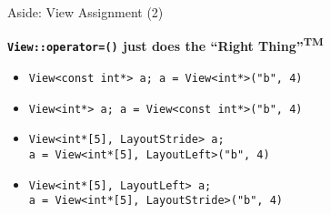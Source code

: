 \begin{frame}[fragile]{Aside: View Assignment (2)}

  \textbf{\texttt{View::operator=()} just does the ``Right Thing''\textsuperscript{TM}}

  \vspace{5pt}

  \begin{itemize}
    \item{\texttt{View<const int*> a; a = View<int*>("b", 4)}}\\
    \pause
    {\color{darkgreen}{$=>$ Okay}}
    \pause
    \item{\texttt{View<int*> a; a = View<const int*>("b", 4)}}\\
    \pause
    {\color{darkred}{$=>$ Compilation error}}
    \pause
    \item{\texttt{View<int*[5], LayoutStride> a;}\\ \texttt{a = View<int*[5], LayoutLeft>("b", 4)}}
    \pause
    {\color{darkgreen}{$=>$ Okay, converting compile-time strides into runtime strides}}
    \pause
    \item{\texttt{View<int*[5], LayoutLeft> a;}\\ \texttt{a = View<int*[5], LayoutStride>("b", 4)}}
    \pause
    {\color{yellow!50!black}{$=>$ Okay, but only if strides match layout left (checked at runtime)}}
  \end{itemize}

\end{frame}

